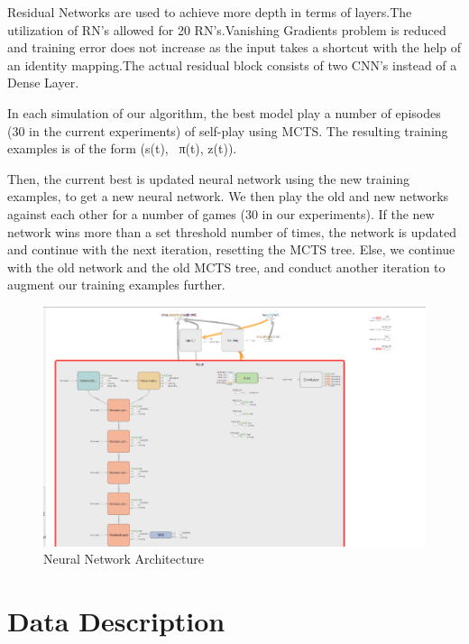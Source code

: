 \documentclass{article}
\begin{document}
    Residual Networks are used to achieve more depth in terms of layers.The utilization of RN’s allowed for 20 RN’s.Vanishing Gradients problem is reduced and training error does not increase as the input takes a shortcut with the help of an identity mapping.The actual residual block consists of two CNN’s instead of a Dense Layer.

    In each simulation of our algorithm, the best model play a number of episodes (30 in  the current experiments) of self-play using MCTS. The resulting training examples is of the form (s(t), ~π(t), z(t)).

    Then, the current best is updated  neural network using the new training examples, to get a new neural network. We then play the old and new networks against each other for a number of games (30 in our experiments). If the new network wins more than a set threshold number of times, the network is updated and continue with the next iteration, resetting the MCTS tree. Else, we continue with the old network and the old MCTS tree, and conduct another iteration to augment our training examples further.

    \blindtext
    \begin{figure}[H]
        \centering
        \includegraphics[width=\textwidth, scale=0.5]{tensorflow.png}
        \caption{Neural Network Architecture}
        \label{fig:my_label}
    \end{figure}


\section{Data Description}
\end{document}
